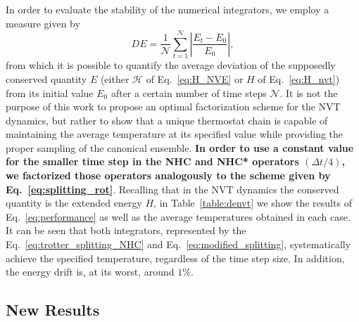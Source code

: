 \documentclass[aip,jcp,reprint,amsmath,amssymb]{revtex4-1}
\begin{document}
In order to evaluate the stability of the numerical integrators, we employ a measure given by\cite{Tuckerman2010}
\begin{equation}
\label{eq:performance}
D\!E =  \frac{1}{\mathcal N} \sum_{t=1}^{\mathcal N} \left| \frac{E_t - E_0}{E_0} \right|,
\end{equation}
from which it is possible to quantify the average deviation of the supposedly conserved quantity $E$ (either $\mathcal{H}$ of Eq.~\eqref{eq:H_NVE} or $H$ of Eq.~\eqref{eq:H_nvt}) from its initial value $E_0$ after a certain number of time steps $\mathcal N$.
It is not the purpose of this work to propose an optimal factorization scheme for the NVT dynamics, but rather to show that a unique thermostat chain is capable of maintaining the average temperature at its specified value while providing the proper sampling of the canonical ensemble. \textbf{In order to use a constant value for the smaller time step in the NHC and NHC* operators $(\Delta t/4)$, we factorized those operators analogously to the scheme given by Eq.~\eqref{eq:splitting_rot}}. Recalling that in the NVT dynamics the conserved quantity is the extended energy $H$, in Table~\eqref{table:denvt} we show the results of Eq.~\eqref{eq:performance} as well as the average temperatures obtained in each case. It can be seen that both integrators, represented by the Eq.~\eqref{eq:trotter_splitting_NHC} and Eq.~\eqref{eq:modified_splitting}, systematically achieve the specified temperature, regardless of the time step size. In addition, the energy drift is, at its worst, around $1 \%$.

\subsection{New Results}
\end{document}
